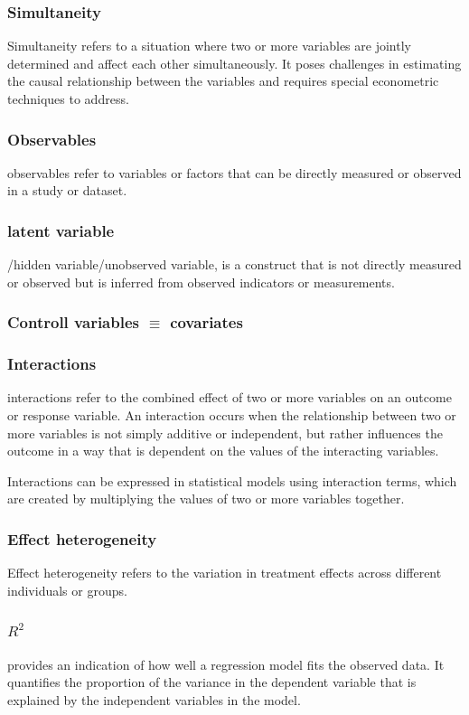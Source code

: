\documentclass[a3paper, 8pt]{extarticle}
\begin{document}
\begin{multicols*}{5}
\subsubsection{Simultaneity} Simultaneity refers to a situation where two or more variables are jointly determined and affect each other simultaneously. It poses challenges in estimating the causal relationship between the variables and requires special econometric techniques to address.

\subsubsection{Observables}
observables refer to variables or factors that can be directly measured or observed in a study or dataset.

\subsubsection{latent variable} /hidden variable/unobserved variable, is a construct that is not directly measured or observed but is inferred from observed indicators or measurements.

\subsubsection{Controll variables $\equiv$ covariates}

\subsubsection{Interactions}
interactions refer to the combined effect of two or more variables on an outcome or response variable. An interaction occurs when the relationship between two or more variables is not simply additive or independent, but rather influences the outcome in a way that is dependent on the values of the interacting variables.

Interactions can be expressed in statistical models using interaction terms, which are created by multiplying the values of two or more variables together.

\subsubsection{Effect heterogeneity}
Effect heterogeneity refers to the variation in treatment effects across different individuals or groups.

\subsubsection{$R^2$}
provides an indication of how well a regression model fits the observed data. It quantifies the proportion of the variance in the dependent variable that is explained by the independent variables in the model.


\end{multicols*}
\end{document}
